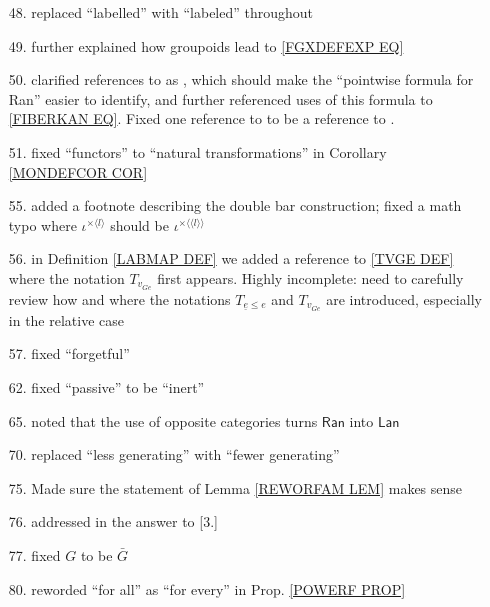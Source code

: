 \documentclass{article}
\begin{document}
\begin{itemize}
\item[48.] replaced ``labelled'' with ``labeled'' throughout

\item[49.] further explained how groupoids lead to \eqref{FGXDEFEXP EQ}

\item[50.] clarified references to \cite[X.3.1]{McL} as \cite[X.3 Thm. 1]{McL}, which should make the ``pointwise formula for Ran'' easier to identify, and further referenced uses of this formula to \eqref{FIBERKAN EQ}.
Fixed one reference to \cite[X.3.1]{McL}
to be a reference to \cite[IX.3]{McL}.

\item[51.] fixed ``functors'' to ``natural transformations'' in Corollary \ref{MONDEFCOR COR}

\item[55.] added a footnote describing the double bar construction;
fixed a math typo where $\iota^{\times \langle l \rangle}$ should be 
$\iota^{\times \langle \langle l \rangle \rangle}$

\item[56.] in Definition \ref{LABMAP DEF} we added a reference to \eqref{TVGE DEF} where the notation $T_{v_{Ge}}$ first appears.
{\color{red} Highly incomplete: need to carefully review how and where the notations $T_{\underline{e} \leq e}$ and $T_{v_{Ge}}$
are introduced, especially in the relative case}

\item[57.] fixed ``forgetful''

\item[62.] fixed ``passive'' to be ``inert''

\item[65.] noted that the use of opposite categories turns $\mathsf{Ran}$ into $\mathsf{Lan}$

\item[70.] replaced ``less generating'' with ``fewer generating''
      
\item[75.] Made sure the statement of Lemma \ref{REWORFAM LEM} makes sense

\item[76.] addressed in the answer to [3.]

\item[77.] fixed $G$ to be $\bar{G}$
      
\item[80.] reworded ``for all'' as ``for every'' in Prop. \ref{POWERF PROP}


\end{itemize}
\end{document}
